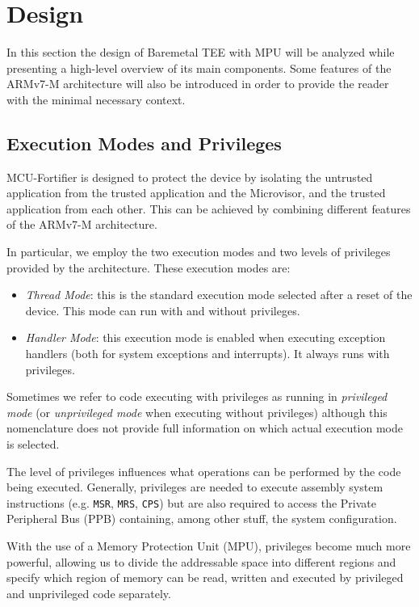 \documentclass{article}
\begin{document}
\newpage
\section{Design}
\label{sec:design}
In this section the design of Baremetal TEE with MPU will be analyzed while presenting a high-level overview of its main components. Some features of the ARMv7-M architecture will also be introduced in order to provide the reader with the minimal necessary context.

\subsection{Execution Modes and Privileges}
\label{subsec:exe_mode}
MCU-Fortifier is designed to protect the device by isolating the untrusted application from the trusted application and the Microvisor, and the trusted application from each other. This can be achieved by combining different features of the ARMv7-M architecture. 

In particular, we employ the two execution modes and two levels of privileges provided by the architecture. These execution modes are:
\begin{itemize}
	\item \textit{Thread Mode}: this is the standard execution mode selected after a reset of the device. This mode can run with and without privileges.
	\item \textit{Handler Mode}: this execution mode is enabled when executing exception handlers (both for system exceptions and interrupts). It always runs with privileges.
\end{itemize}

Sometimes we refer to code executing with privileges as running in \textit{privileged mode} (or \textit{unprivileged mode} when executing without privileges) although this nomenclature does not provide full information on which actual execution mode is selected.

The level of privileges influences what operations can be performed by the code being executed. Generally, privileges are needed to execute assembly system instructions (e.g. \verb|MSR|, \verb|MRS|, \verb|CPS|) but are also required to access the Private Peripheral Bus (PPB) containing, among other stuff, the system configuration.

With the use of a Memory Protection Unit (MPU), privileges become much more powerful, allowing us to divide the addressable space into different regions and specify which region of memory can be read, written and executed by privileged and unprivileged code separately.
\end{document}
